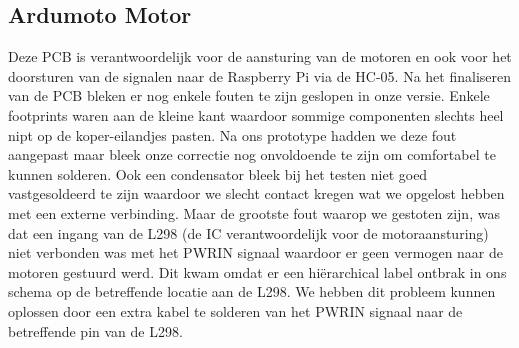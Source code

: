 \subsection{Ardumoto Motor}
Deze PCB is verantwoordelijk voor de aansturing van de motoren en ook voor het doorsturen van de signalen naar de Raspberry Pi via de HC-05. Na het finaliseren van de PCB bleken er nog enkele fouten te zijn geslopen in onze versie. Enkele footprints waren aan de kleine kant waardoor sommige componenten slechts heel nipt op de koper-eilandjes pasten. Na ons prototype hadden we deze fout aangepast maar bleek onze correctie nog onvoldoende te zijn om comfortabel te kunnen solderen. Ook een condensator bleek bij het testen niet goed vastgesoldeerd te zijn waardoor we slecht contact kregen wat we opgelost hebben met een externe verbinding. Maar de grootste fout waarop we gestoten zijn, was dat een ingang van de L298 (de IC verantwoordelijk voor de motoraansturing) niet verbonden was met het PWRIN signaal waardoor er geen vermogen naar de motoren gestuurd werd. Dit kwam omdat er een hi\"erarchical label ontbrak in ons schema op de betreffende locatie aan de L298. We hebben dit probleem kunnen oplossen door een extra kabel te solderen van het PWRIN signaal naar de betreffende pin van de L298. \\
